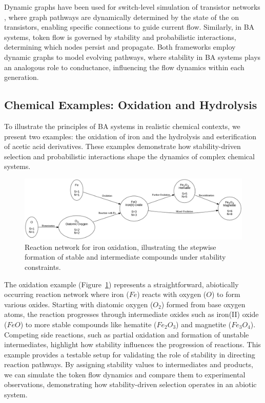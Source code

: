 \documentclass[entropy,article,submit,pdftex,oneauthor]{Definitions/mdpi}
\begin{document}
Dynamic graphs have been used for switch-level simulation of transistor networks \cite{AdlerCAD}, where graph pathways are dynamically determined by the state of the on transistors, enabling specific connections to guide current flow. Similarly, in BA systems, token flow is governed by stability and probabilistic interactions, determining which nodes persist and propagate. Both frameworks employ dynamic graphs to model evolving pathways, where stability in BA systems plays an analogous role to conductance, influencing the flow dynamics within each generation.

\subsection{Chemical Examples: Oxidation and Hydrolysis}

To illustrate the principles of BA systems in realistic chemical contexts, we present two examples: the oxidation of iron and the hydrolysis and esterification of acetic acid derivatives. These examples demonstrate how stability-driven selection and probabilistic interactions shape the dynamics of complex chemical systems.

\begin{figure}[h]
    \centering
    \includegraphics[width=1\textwidth]{abc_oxi.png}
    \caption{Reaction network for iron oxidation, illustrating the stepwise formation of stable and intermediate compounds under stability constraints.}
    \label{fig:abc_oxi}
\end{figure}

The oxidation example (Figure~\ref{fig:abc_oxi}) represents a straightforward, abiotically occurring reaction network where iron (\(Fe\)) reacts with oxygen (\(O\)) to form various oxides. Starting with diatomic oxygen (\(O_2\)) formed from base oxygen atoms, the reaction progresses through intermediate oxides such as iron(II) oxide (\(FeO\)) to more stable compounds like hematite (\(Fe_2O_3\)) and magnetite (\(Fe_3O_4\)). Competing side reactions, such as partial oxidation and formation of unstable intermediates, highlight how stability influences the progression of reactions. This example provides a testable setup for validating the role of stability in directing reaction pathways. By assigning stability values to intermediates and products, we can simulate the token flow dynamics and compare them to experimental observations, demonstrating how stability-driven selection operates in an abiotic system.
\end{document}
